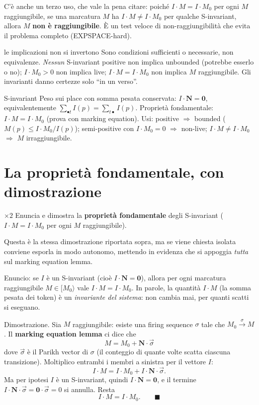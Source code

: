 C'è anche un terzo uso, che vale la pena citare: poiché $I\cdot M = I\cdot M_0$ per ogni $M$ raggiungibile, se una marcatura $M$ ha $I\cdot M \ne I\cdot M_0$ per qualche S-invariant, allora $M$ \textbf{non è raggiungibile}. È un test veloce di non-raggiungibilità che evita il problema completo (EXPSPACE-hard).

\begin{attenzione}{le implicazioni non si invertono}
Sono condizioni sufficienti o necessarie, non equivalenze. \emph{Nessun} S-invariant positive non implica unbounded (potrebbe esserlo o no); $I\cdot M_0 > 0$ non implica live; $I\cdot M = I\cdot M_0$ non implica $M$ raggiungibile. Gli invarianti danno certezze solo ``in un verso''.
\end{attenzione}

\begin{puntochiave}{S-invariant}
Peso sui place con somma pesata conservata: $I\cdot\mathbf{N}=\mathbf{0}$, equivalentemente $\sum_{\bullet t}I(p)=\sum_{t\bullet}I(p)$. Proprietà fondamentale: $I\cdot M = I\cdot M_0$ (prova con marking equation). Usi: positive $\Rightarrow$ bounded ($M(p)\le I\cdot M_0/I(p)$); semi-positive con $I\cdot M_0=0$ $\Rightarrow$ non-live; $I\cdot M\ne I\cdot M_0$ $\Rightarrow$ $M$ irraggiungibile.
\end{puntochiave}

\section{La proprietà fondamentale, con dimostrazione}

\begin{domanda}{$\times 2$}
Enuncia e dimostra la \textbf{proprietà fondamentale} degli S-invariant ($I \cdot M = I \cdot M_0$ per ogni $M$ raggiungibile).
\end{domanda}

Questa è la stessa dimostrazione riportata sopra, ma se viene chiesta isolata conviene esporla in modo autonomo, mettendo in evidenza che si appoggia \emph{tutta} sul marking equation lemma.

Enuncio: se $I$ è un S-invariant (cioè $I\cdot\mathbf{N}=\mathbf{0}$), allora per ogni marcatura raggiungibile $M \in [M_0\rangle$ vale $I\cdot M = I\cdot M_0$. In parole, la quantità $I\cdot M$ (la somma pesata dei token) è un \emph{invariante del sistema}: non cambia mai, per quanti scatti si eseguano.

Dimostrazione. Sia $M$ raggiungibile: esiste una firing sequence $\sigma$ tale che $M_0 \xrightarrow{\sigma} M$. Il \textbf{marking equation lemma} ci dice che
$$M = M_0 + \mathbf{N}\cdot\vec{\sigma}$$
dove $\vec{\sigma}$ è il Parikh vector di $\sigma$ (il conteggio di quante volte scatta ciascuna transizione). Moltiplico entrambi i membri a sinistra per il vettore $I$:
$$I\cdot M = I\cdot M_0 + I\cdot\mathbf{N}\cdot\vec{\sigma}.$$
Ma per ipotesi $I$ è un S-invariant, quindi $I\cdot\mathbf{N} = \mathbf{0}$, e il termine $I\cdot\mathbf{N}\cdot\vec{\sigma} = \mathbf{0}\cdot\vec{\sigma} = 0$ si annulla. Resta
$$I\cdot M = I\cdot M_0. \qquad \blacksquare$$

